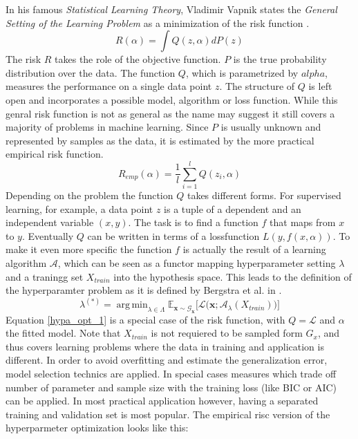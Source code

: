 \documentclass[english]{article}
\newcommand{\x}{\mathbf{x}}
\newcommand{\E}{\mathbb{E}}
\DeclareMathOperator*{\argmin}{arg\,min}
\begin{document}
In his famous \textit{Statistical Learning Theory}, Vladimir Vapnik states the \textit{General Setting of the Learning Problem} as a minimization of the risk function \cite{vapnik_overview_1999}.
\begin{equation}
R(\alpha) = \int Q(z,\alpha)dP(z)
\label{risk}
\end{equation}
The risk $R$ takes the role of the objective function. $P$ is the true probability distribution over the data. The function $Q$, which is parametrized by $alpha$, measures the performance on a single data point $z$. The structure of $Q$ is left open and incorporates a possible model, algorithm or loss function. While this genral risk function is not as general as the name may suggest it still covers a majority of problems in machine learning. Since $P$ is usually unknown and represented by samples as the data, it is estimated by the more practical empirical risk function.
\begin{equation}
R_{emp}(\alpha) = \frac{1}{l} \sum_{i=1}^l Q(z_i,\alpha)
\label{empirical risk}
\end{equation}
Depending on the problem the function $Q$ takes different forms. For supervised learning, for example, a data point $z$ is a tuple of a dependent and an independent variable $(x,y)$. The task is to find a function $f$ that maps from $x$ to $y$. Eventually $Q$ can be written in terms of a lossfunction $L(y,f(x,\alpha))$.
To make it even more specific the function $f$ is actually the result of a learning algorithm $\mathcal{A}$, which can be seen as a functor mapping hyperparameter setting $\lambda$ and a traningg set $X_{train}$ into the hypothesis space. This leads to the definition of the hyperparamter problem as it is defined by Bergstra et al. in \cite{bergstra_random_2012}.
\begin{equation}
\lambda^{(*)} = \argmin_{\lambda \in \Lambda} \E_{\x \sim \mathcal{G}_\x}\big[\mathcal{L}\big(\x;\mathcal{A}_\lambda(X_{train})\big)\big]
\label{hypa_opt_1}
\end{equation}
Equation \ref{hypa_opt_1} is a special case of the risk function, with $Q = \mathcal{L}$ and $\alpha$ the fitted model. Note that $X_{train}$ is not requiered to be sampled form $G_x$, and thus covers learning problems where the data in training and application is different.
In order to avoid overfitting and estimate the generalization error, model selection technics are applied. In special cases measures which trade off number of parameter and sample size with the training loss (like BIC or AIC) can be applied. In most practical application however, having a separated training and validation set is most popular. The empirical risc version of the hyperparmeter optimization looks like this:
\end{document}
